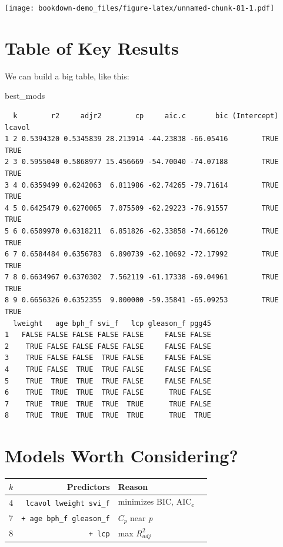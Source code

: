 \documentclass[]{book}
\newenvironment{Shaded}{\begin{snugshade}}{\end{snugshade}}
\newcommand{\NormalTok}[1]{#1}
\theoremstyle{definition}
\theoremstyle{definition}
\theoremstyle{definition}
\theoremstyle{remark}
\begin{document}
\texttt{[image: bookdown-demo\_files/figure-latex/unnamed-chunk-81-1.pdf]}

\section{Table of Key Results}\label{table-of-key-results}

We can build a big table, like this:

\begin{Shaded}
\begin{Highlighting}[]
\NormalTok{best_mods}
\end{Highlighting}
\end{Shaded}

\begin{verbatim}
  k        r2     adjr2        cp     aic.c       bic (Intercept) lcavol
1 2 0.5394320 0.5345839 28.213914 -44.23838 -66.05416        TRUE   TRUE
2 3 0.5955040 0.5868977 15.456669 -54.70040 -74.07188        TRUE   TRUE
3 4 0.6359499 0.6242063  6.811986 -62.74265 -79.71614        TRUE   TRUE
4 5 0.6425479 0.6270065  7.075509 -62.29223 -76.91557        TRUE   TRUE
5 6 0.6509970 0.6318211  6.851826 -62.33858 -74.66120        TRUE   TRUE
6 7 0.6584484 0.6356783  6.890739 -62.10692 -72.17992        TRUE   TRUE
7 8 0.6634967 0.6370302  7.562119 -61.17338 -69.04961        TRUE   TRUE
8 9 0.6656326 0.6352355  9.000000 -59.35841 -65.09253        TRUE   TRUE
  lweight   age bph_f svi_f   lcp gleason_f pgg45
1   FALSE FALSE FALSE FALSE FALSE     FALSE FALSE
2    TRUE FALSE FALSE FALSE FALSE     FALSE FALSE
3    TRUE FALSE FALSE  TRUE FALSE     FALSE FALSE
4    TRUE FALSE  TRUE  TRUE FALSE     FALSE FALSE
5    TRUE  TRUE  TRUE  TRUE FALSE     FALSE FALSE
6    TRUE  TRUE  TRUE  TRUE FALSE      TRUE FALSE
7    TRUE  TRUE  TRUE  TRUE  TRUE      TRUE FALSE
8    TRUE  TRUE  TRUE  TRUE  TRUE      TRUE  TRUE
\end{verbatim}

\section{Models Worth Considering?}\label{models-worth-considering}

\begin{longtable}[]{@{}rrll@{}}
\toprule
\(k\) & Predictors & Reason\tabularnewline
\midrule
\endhead
4 & \texttt{lcavol\ lweight\ svi\_f} & minimizes BIC,
AIC\textsubscript{c}\tabularnewline
7 & \texttt{+\ age\ bph\_f\ gleason\_f} & \(C_p\) near
\emph{p}\tabularnewline
8 & \texttt{+\ lcp} & max \(R^2_{adj}\)\tabularnewline
\bottomrule
\end{longtable}
\end{document}
